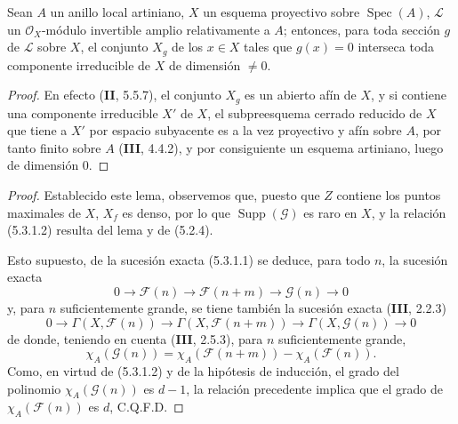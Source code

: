 \begin{lemma}[5.3.1.3]
\label{IV.2.s5.3.1.3-fr}
Sean $A$ un anillo local artiniano, $X$ un esquema proyectivo sobre
$\operatorname{Spec}(A)$, $\mathcal L$ un $\mathcal O_X$-módulo invertible
amplio relativamente a $A$; entonces, para toda sección $g$ de $\mathcal L$
sobre $X$, el conjunto $X_g$ de los $x\in X$ tales que $g(x)=0$ interseca
toda componente irreducible de $X$ de dimensión $\ne0$.
\end{lemma}

\begin{proof}
En efecto (\textbf{II}, 5.5.7), el conjunto $X_g$ es un abierto afín de $X$, y si
contiene una componente irreducible $X'$ de $X$, el subpreesquema cerrado
reducido de $X$ que tiene a $X'$ por espacio subyacente es a la vez proyectivo
y afín sobre $A$, por tanto finito sobre $A$ (\textbf{III}, 4.4.2), y por consiguiente
un esquema artiniano, luego de dimensión $0$.
\end{proof}

\begin{proof}
Establecido este lema, observemos que, puesto que $Z$ contiene los puntos
maximales de $X$, $X_f$ es denso, por lo que
$\operatorname{Supp}(\mathcal G)$ es raro en $X$, y la relación (5.3.1.2)
resulta del lema y de (5.2.4).


Esto supuesto, de la sucesión exacta (5.3.1.1) se deduce, para todo $n$, la
sucesión exacta
\[
0\longrightarrow\mathcal F(n)\longrightarrow\mathcal F(n+m)
\longrightarrow\mathcal G(n)\longrightarrow0
\]
y, para $n$ suficientemente grande, se tiene también la sucesión exacta
(\textbf{III}, 2.2.3)
\[
0\longrightarrow\Gamma(X,\mathcal F(n))
\longrightarrow\Gamma(X,\mathcal F(n+m))
\longrightarrow\Gamma(X,\mathcal G(n))\longrightarrow0
\]
de donde, teniendo en cuenta (\textbf{III}, 2.5.3), para $n$ suficientemente grande,
\[
\chi_A(\mathcal G(n))
=\chi_A(\mathcal F(n+m))-\chi_A(\mathcal F(n)).
\]
Como, en virtud de (5.3.1.2) y de la hipótesis de inducción, el grado del
polinomio $\chi_A(\mathcal G(n))$ es $d-1$, la relación precedente implica
que el grado de $\chi_A(\mathcal F(n))$ es $d$, C.Q.F.D.
\end{proof}
